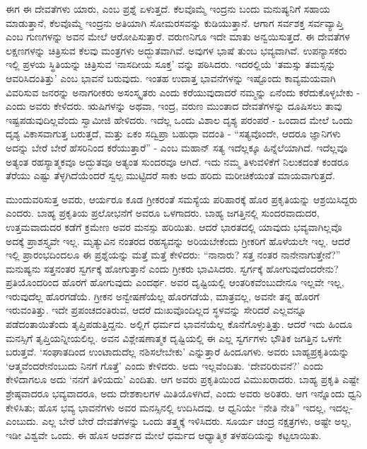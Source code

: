 ಈಗ ಈ ದೇವತೆಗಳು ಯಾರು, ಎಂಬ ಪ್ರಶ್ನೆ ಏಳುತ್ತದೆ. ಕೆಲವೊಮ್ಮೆ ಇಂದ್ರನು ಬಂದು ಮನುಷ್ಯನಿಗೆ ಸಹಾಯ ಮಾಡುತ್ತಾನೆ, ಕೆಲವೊಮ್ಮೆ ಇಂದ್ರನು ಅತಿಯಾಗಿ ಸೋಮರಸವನ್ನು ಕುಡಿಯುತ್ತಾನೆ. ಆಗಾಗ ಸರ್ವಶಕ್ತ ಸರ್ವವ್ಯಾಪ್ತಿ ಎಂಬ ಗುಣಗಳನ್ನು ಅವನ ಮೇಲೆ ಆರೋಪಿಸುತ್ತಾರೆ. ವರುಣನಿಗೂ ಇದೇ ಮಾತು ಅನ್ವಯಿಸುತ್ತದೆ. ಈ ದೇವತೆಗಳ ಲಕ್ಷಣಗಳನ್ನು ಚಿತ್ರಿಸುವ ಕೆಲವು ಮಂತ್ರಗಳು ಅದ್ಭುತವಾಗಿವೆ. ಅವುಗಳ ಭಾಷೆ ತುಂಬ ಭವ್ಯವಾಗಿವೆ. ಉಪನ್ಯಾಸಕರು ಇಲ್ಲಿ ಪ್ರಳಯ ಸ್ಥಿತಿಯನ್ನು ಚಿತ್ರಿಸುವ ‘ನಾಸದೀಯ ಸೂಕ್ತ’ ವನ್ನು ಪಠಿಸಿದರು. ಇದರಲ್ಲಿಯೆ ‘ತಮಸ್ಸು ತಮಸ್ಸನ್ನು ಆವರಿಸಿದಂತಿತ್ತು’ ಎಂಬ ಭಾವನೆ ಬರುವುದು. ಇಂತಹ ಉದಾತ್ತ ಭಾವನೆಗಳನ್ನು ಇಷ್ಟೊಂದು ಕಾವ್ಯಮಯವಾಗಿ ವಿವರಿಸುವ ಜನರನ್ನು ಅನಾಗರೀಕರು ಅಸಂಸ್ಕೃತರು ಎಂದು ಕರೆಯುವುದಾದರೆ ನಮ್ಮನ್ನು ಏನೆಂದು ಕರೆದುಕೊಳ್ಳಬೇಕು - ಎಂದು ಅವರು ಕೇಳಿದರು. ಋಷಿಗಳನ್ನು ಅಥವಾ, ಇಂದ್ರ, ವರುಣ ಮುಂತಾದ ದೇವತೆಗಳನ್ನು ದೂಷಿಸಲು ತಾವು ಇಷ್ಟಪಡುವುದಿಲ್ಲವೆಂದು ಸ್ವಾಮೀಜಿ ಹೇಳಿದರು. ಇದೆಲ್ಲ ಒಂದು ವಿಶಾಲ ದೃಶ್ಯ ಪರಂಪರೆ - ಒಂದಾದ ಮೇಲೆ ಒಂದು ದೃಶ್ಯ ವಿಕಾಸವಾಗುತ್ತ ಬರುತ್ತದೆ, ಮತ್ತು ಏಕಂ ಸದ್ವಿಪ್ರಾ ಬಹುಧಾ ವದಂತಿ - “ಸತ್ಯವೊಂದೇ, ಆದರೂ ಜ್ಞಾನಿಗಳು ಅದನ್ನು ಬೇರೆ ಬೇರೆ ಹೆಸರಿನಿಂದ ಕರೆಯುತ್ತಾರೆ” - ಎಂಬ ಮಹಾನ್​ ಸತ್ಯ ಇದೆಲ್ಲಕ್ಕೂ ಹಿನ್ನೆಲೆಯಾಗಿದೆ. ಇದೆಲ್ಲವೂ ಅತ್ಯಂತ ರಹಸ್ಯಾತ್ಮಕವೂ ಅದ್ಭುತವೂ ಅತ್ಯಂತ ಸುಂದರವೂ ಆಗಿದೆ. ಇದು ನಮ್ಮ ತಿಳುವಳಿಕೆಗೆ ನಿಲುಕದಂತೆ ಕಂಡರೂ ತೆರೆಯು ಎಷ್ಟು ತೆಳ್ಳಗಿದೆಯೆಂದರೆ ಸ್ವಲ್ಪ ಮುಟ್ಟಿದರೆ ಸಾಕು ಅದು ಹರಿದು ಮರೀಚಿಕೆಯಂತೆ ಮಾಯವಾಗುತ್ತದೆ.

ಮುಂದುವರಿಸುತ್ತ ಅವರು, ಆರ್ಯರೂ ಕೂಡ ಗ್ರೀಕರಂತೆ ಸಮಸ್ಯೆಯ ಪರಿಹಾರಕ್ಕೆ ಹೊರ ಪ್ರಕೃತಿಯನ್ನು ಆಶ್ರಯಿಸಿದ್ದರು ಎಂದರು. ಬಾಹ್ಯ ಪ್ರಕೃತಿಯ ಪ್ರಲೋಭನೆಗೆ ಅವರೂ ಒಳಗಾದರು. ಬಾಹ್ಯ ಜಗತ್ತಿನಲ್ಲಿ ಸುಂದರವಾದುದರ, ಉತ್ತಮವಾದುದರ ಕಡೆಗೆ ಕ್ರಮೇಣ ಅವರ ಮನಸ್ಸು ಹರಿಯಿತು. ಆದರೆ ಭಾರತದಲ್ಲಿ ಯಾವುದು ಭವ್ಯವಾಗಿಲ್ಲವೊ ಅದಕ್ಕೆ ಪ್ರಾಶಸ್ತ್ಯವೇ ಇಲ್ಲ. ಮೃತ್ಯುವಿನ ನಂತರದ ರಹಸ್ಯವನ್ನು ಅರಿಯಬೇಕೆಂದು ಗ್ರೀಕರಿಗೆ ಹೊಳೆಯಲೇ ಇಲ್ಲ. ಆದರೆ ಇಲ್ಲಿ ಪ್ರಾರಂಭದಿಂದಲೂ ಈ ಪ್ರಶ್ನೆಯನ್ನು ಮತ್ತೆ ಮತ್ತೆ ಕೇಳಿದರು: “ನಾನಾರು? ಸತ್ತ ನಂತರ ನಾನೇನಾಗುತ್ತೇನೆ?” ಮನುಷ್ಯನು ಸತ್ತನಂತರ ಸ್ವರ್ಗಕ್ಕೆ ಹೋಗುತ್ತಾನೆ ಎಂದು ಗ್ರೀಕರು ಭಾವಿಸಿದರು. ಸ್ವರ್ಗಕ್ಕೆ ಹೋಗುವುದೆಂದರೇನು? ಪ್ರತಿಯೊಂದರಿಂದ ಹೊರಗೆ ಹೋಗುವುದು ಎಂದರ್ಥ. ಅವರ ದೃಷ್ಟಿಯಲ್ಲಿ ಆಂತರಿಕವೆಂಬುದೇನೂ ಇಲ್ಲವೇ ಇಲ್ಲ, ಇರುವುದೆಲ್ಲ ಹೊರಗಡೆಯೆ. ಗ್ರೀಕನ ಅನ್ವೇಷಣೆಯೆಲ್ಲ ಹೊರಗಡೆಯೆ, ಮಾತ್ರವಲ್ಲ, ಅವನೇ ತನ್ನ ಹೊರಗೆ ಇರುವಂತಿತ್ತು. ಇದೇ ಪ್ರಪಂಚದಂತಿರುವ, ಆದರೆ ದುಃಖವೊಂದಿಲ್ಲದ ಸ್ಥಳವನ್ನು ಸೇರಿದರೆ ಎಲ್ಲವನ್ನೂ ಪಡೆದಂತಾಯಿತೆಂದು ತೃಪ್ತಿಪಡುತ್ತಿದ್ದನು. ಅಲ್ಲಿಗೆ ಧರ್ಮದ ಭಾವನೆಯೆಲ್ಲ ಕೊನೆಗೊಳ್ಳುತ್ತಿತ್ತು. ಆದರೆ ಇದು ಹಿಂದೂ ಮನಸ್ಸಿಗೆ ತೃಪ್ತಿಯನ್ನೀಯಲಿಲ್ಲ. ಅವನ ವಿಶ್ಲೇಷಣಾತ್ಮಕ ದೃಷ್ಟಿಯಲ್ಲಿ ಈ ಎಲ್ಲ ಸ್ವರ್ಗಗಳು ಭೌತಿಕ ಜಗತ್ತಿನ ಒಳಗೇ ಬರುತ್ತವೆ. ‘ಸಂಘಾತದಿಂದ ಉಂಟಾದುದೆಲ್ಲ ನಶಿಸಲೇಬೇಕು’ ಎನ್ನುತ್ತಾರೆ ಹಿಂದೂಗಳು. ಅವರು ಬಾಹ್ಯಪ್ರಕೃತಿಯನ್ನು ‘ಆತ್ಮವೆಂದರೇನೆಂಬುದು ನಿನಗೆ ಗೊತ್ತೆ’ ಎಂದು ಕೇಳಿದರು. ಅದು ಇಲ್ಲವೆಂದಿತು. ‘ದೇವರಿರುವನೆ?’ ಎಂದು ಕೇಳಿದಾಗಲೂ ಅದು ‘ನನಗೆ ತಿಳಿಯದು’ ಎಂದಿತು. ಆಗ ಅವರು ಪ್ರಕೃತಿಯಿಂದ ವಿಮುಖರಾದರು. ಬಾಹ್ಯ ಪ್ರಕೃತಿ ಎಷ್ಟೇ ಶ್ರೇಷ್ಠವಾದರೂ ಭವ್ಯವಾದರೂ, ಅದು ದೇಶಕಾಲಗಳ ಮಿತಿಯೊಳಗಿದೆ, ಎಂದು ಅವರು ಅರಿತರು. ಆಗ ಇನ್ನೊಂದು ಧ್ವನಿ ಕೇಳಿಸಿತು; ಹೊಸ ಭವ್ಯ ಭಾವನೆಗಳು ಅವರ ಮನಸ್ಸಿನಲ್ಲಿ ಉದಿಸಿದವು. ಆ ಧ್ವನಿಯೇ “ನೇತಿ ನೇತಿ” ಇದಲ್ಲ, ಇದಲ್ಲ- ಎಂಬುದು. ಎಲ್ಲ ಬೇರೆ ಬೇರೆ ದೇವತೆಗಳನ್ನು ಒಂದು ತತ್ತ್ವಕ್ಕೆ ಇಳಿಸಿದರು. ಸೂರ್ಯ ಚಂದ್ರ ನಕ್ಷತ್ರಗಳು, ಅಷ್ಟೇ ಅಲ್ಲ, ಇಡೀ ವಿಶ್ವವೇ ಒಂದು. ಈ ಹೊಸ ಆದರ್ಶದ ಮೇಲೆ ಧರ್ಮದ ಆಧ್ಯಾತ್ಮಿಕ ತಳಹದಿಯನ್ನು ಕಟ್ಟಲಾಯಿತು.

